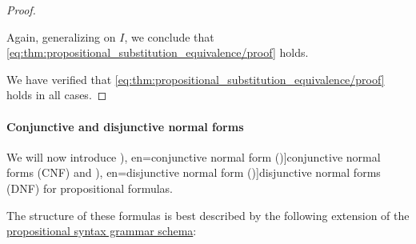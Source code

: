 \begin{proof}
\begin{itemize}
    Again, generalizing on \( I \), we conclude that \eqref{eq:thm:propositional_substitution_equivalence/proof} holds.
  \end{itemize}

  We have verified that \eqref{eq:thm:propositional_substitution_equivalence/proof} holds in all cases.
\end{proof}

\paragraph{Conjunctive and disjunctive normal forms}

\begin{definition}\label{def:cnf_and_dnf}\mimprovised
  We will now introduce \term[ru=конъюнктивная нормальная форма (\cite[def. 6.2]{Эдельман1975Логика}), en=conjunctive normal form (\cite[def. 1.3.10]{Hinman2005Logic})]{conjunctive normal forms} (CNF) and \term[ru=дизъюнктивная нормальная форма (\cite[def. 6.2]{Эдельман1975Логика}), en=disjunctive normal form (\cite[def. 1.3.10]{Hinman2005Logic})]{disjunctive normal forms} (DNF) for propositional formulas.

  The structure of these formulas is best described by the following extension of the \hyperref[def:propositional_syntax]{propositional syntax grammar schema}:
  \begin{bnf*}
           {} \\
           {\synneg {}} \\
                    {       \bnfor {}} \\
     { \bnfor} \\
     \\
                        { \bnfor \bnftsq{(} \bnfsp {}              \bnfsp \bnftsq{\( \synwedge \)} \bnfsp {}             \bnfsp \bnftsq{)}} \\
     { \bnfor} \\
     \\
                        { \bnfor \bnftsq{(} \bnfsp {}              \bnfsp \bnftsq{\( \synvee \)}   \bnfsp {}             \bnfsp \bnftsq{)}}
  \end{bnf*}
\end{definition}
